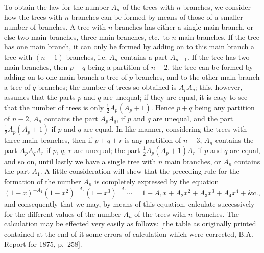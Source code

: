 \documentclass[12pt,a4paper]{article}
\theoremstyle{definition}
\begin{document}
To obtain the law for the number $A_n$ of the trees with $n$ branches, we consider how
the trees with $n$ branches can be formed by means of those of a smaller number of
branches. A tree with $n$ branches has either a single main branch, or else two main
branches, three main branches, etc.\ to $n$ main branches. If the tree has one main
branch, it can only be formed by adding on to this main branch a tree with $(n-1)$
branches, i.e. $A_n$ contains a part $A_{n-1}$. If the tree has two main branches, then
$p + q$ being a partition of $n - 2$, the tree can be formed by adding on to one main
branch a tree of $p$ branches, and to the other main branch a tree of $q$ branches; the
number of trees so obtained is $A_p A_q$; this, however, assumes that the parts $p$ and $q$
are unequal; if they are equal, it is easy to see that the number of trees is only
$\tfrac{1}{2}A_p(A_p + 1)$. Hence $p + q$ being any partition of $n - 2$, $A_n$ contains the part $A_p A_q$,
if $p$ and $q$ are unequal, and the part $\tfrac{1}{2}A_p(A_p + 1)$ if $p$ and $q$ are equal. In like
manner, considering the trees with three main branches, then if $p + q + r$ is any
partition of $n - 3$, $A_n$ contains the part $A_p A_q A_r$ if $p$, $q$, $r$ are unequal; the part
$\tfrac{1}{2}A_p(A_p + 1)A_r$ if $p$ and $q$ are equal, and so on, until lastly we have a single
tree with $n$ main branches, or $A_n$ contains the part $A_1$. A little consideration will
shew that the preceding rule for the formation of the number $A_n$ is completely expressed
by the equation
\[
(1 - x)^{-A_1}(1 - x^2)^{-A_2}(1 - x^3)^{-A_3}\cdots = 1 + A_1 x + A_2 x^2 + A_3 x^3 + A_4 x^4 + \&\textrm{c.},
\]
and consequently that we may, by means of this equation, calculate successively for
the different values of the number $A_n$ of the trees with $n$ branches. The calculation
may be effected very easily as follows: [the table as originally printed contained at the
end of it some errors of calculation which were corrected, B.A. Report for 1875, p.~258].
\end{document}
